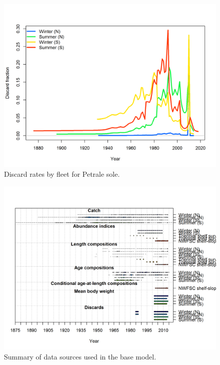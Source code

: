 \documentclass[12pt,]{article}
\begin{document}
\begin{figure}
\centering
\includegraphics{r4ss/plots_mod1/catch8 discard fraction.png}
\caption{Discard rates by fleet for Petrale sole. \label{fig:Discard}}
\end{figure}

\FloatBarrier

\begin{figure}
\centering
\includegraphics{r4ss/plots_mod1/data_plot2.png}
\caption{Summary of data sources used in the base model.
\label{fig:data_plot}}
\end{figure}

\FloatBarrier
\end{document}
